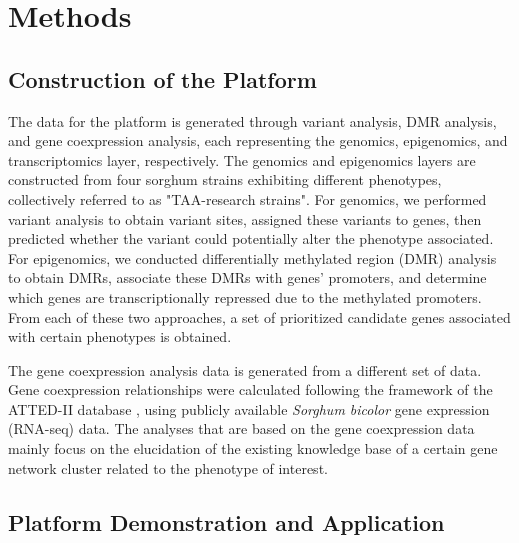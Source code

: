\chapter{Methods}

\section{Construction of the Platform}
\hspace{1em}The data for the platform is generated through variant analysis, DMR analysis, and gene coexpression analysis, each representing the genomics, epigenomics, and transcriptomics layer, respectively. The genomics and epigenomics layers are constructed from four sorghum strains exhibiting different phenotypes, collectively referred to as "TAA-research strains". For genomics, we performed variant analysis to obtain variant sites, assigned these variants to genes, then predicted whether the variant could potentially alter the phenotype associated. For epigenomics, we conducted differentially methylated region (DMR) analysis to obtain DMRs, associate these DMRs with genes' promoters, and determine which genes are transcriptionally repressed due to the methylated promoters. From each of these two approaches, a set of prioritized candidate genes associated with certain phenotypes is obtained.

\hspace{1em}The gene coexpression analysis data is generated from a different set of data. Gene coexpression relationships were calculated following the framework of the ATTED-II database \cite{obayashiATTEDIIV11Plant2022}, using publicly available \textit{Sorghum bicolor} gene expression (RNA-seq) data. The analyses that are based on the gene coexpression data mainly focus on the elucidation of the existing knowledge base of a certain gene network cluster related to the phenotype of interest.

\section{Platform Demonstration and Application}
